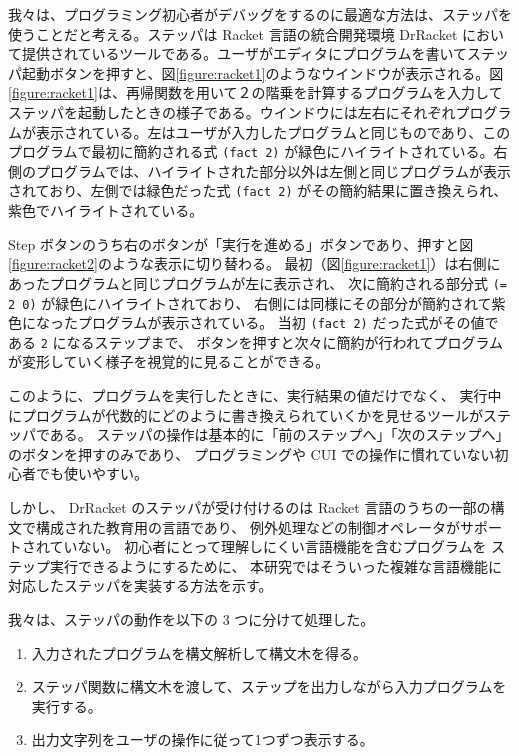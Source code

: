 我々は、プログラミング初心者がデバッグをするのに最適な方法は、ステッパを使うことだと考える。ステッパは Racket 言語の統合開発環境 DrRacket において提供されているツール\cite{clements01}である。ユーザがエディタにプログラムを書いてステッパ起動ボタンを押すと、図\ref{figure:racket1}のようなウインドウが表示される。図\ref{figure:racket1}は、再帰関数を用いて２の階乗を計算するプログラムを入力してステッパを起動したときの様子である。ウインドウには左右にそれぞれプログラムが表示されている。左はユーザが入力したプログラムと同じものであり、このプログラムで最初に簡約される式 \texttt{(fact 2)} が緑色にハイライトされている。右側のプログラムでは、ハイライトされた部分以外は左側と同じプログラムが表示されており、左側では緑色だった式 \texttt{(fact 2)} がその簡約結果に置き換えられ、紫色でハイライトされている。

Step ボタンのうち右のボタンが「実行を進める」ボタンであり、押すと図\ref{figure:racket2}のような表示に切り替わる。
最初（図\ref{figure:racket1}）は右側にあったプログラムと同じプログラムが左に表示され、
次に簡約される部分式 \texttt{(= 2 0)} が緑色にハイライトされており、
右側には同様にその部分が簡約されて紫色になったプログラムが表示されている。
当初 \texttt{(fact 2)} だった式がその値である \texttt{2} になるステップまで、
ボタンを押すと次々に簡約が行われてプログラムが変形していく様子を視覚的に見ることができる。

このように、プログラムを実行したときに、実行結果の値だけでなく、
実行中にプログラムが代数的にどのように書き換えられていくかを見せるツールがステッパである。
ステッパの操作は基本的に「前のステップへ」「次のステップへ」のボタンを押すのみであり、
プログラミングや CUI での操作に慣れていない初心者でも使いやすい。

しかし、
DrRacket のステッパが受け付けるのは Racket 言語のうちの一部の構文で構成された教育用の言語であり、
例外処理などの制御オペレータがサポートされていない。
初心者にとって理解しにくい言語機能を含むプログラムを
ステップ実行できるようにするために、
本研究ではそういった複雑な言語機能に対応したステッパを実装する方法を示す。

我々は、ステッパの動作を以下の 3 つに分けて処理した。

\begin{enumerate}
\item 入力されたプログラムを構文解析して構文木を得る。
\item ステッパ関数に構文木を渡して、ステップを出力しながら入力プログラムを実行する。
\item 出力文字列をユーザの操作に従って1つずつ表示する。
\end{enumerate}

